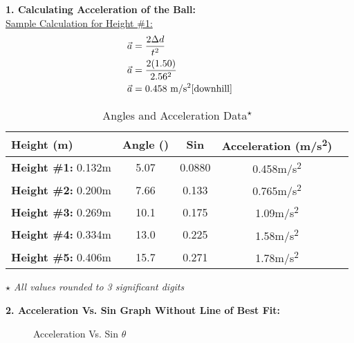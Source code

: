 \documentclass[12pt,letterpaper]{article}
\begin{document}
\textbf{1. Calculating Acceleration of the Ball:} \\
\underline{Sample Calculation for Height \#1:}\\
\[
	\begin{aligned}
		\vec{a} & =\frac{2\Delta d}{t^2}                         \\
		\vec{a} & =\frac{2(1.50)}{2.56^2}                        \\
		\vec{a} & =0.458~\text{m/s\textsuperscript{2}[downhill]}
	\end{aligned}
\]
\begin{table}[H]
	\caption{Angles and Acceleration Data\textsuperscript{$\star$}\label{table2}}
	\begin{tabular*}{\textwidth}{l@{\extracolsep{\fill}}cccc}
		\hline
		\textbf{\hspace{4mm} Height (m)} & \textbf{Angle (\textdegree)} & \textbf{Sin \bm{$\theta$}} & \textbf{Acceleration (m/s\textsuperscript{2})} \\
		\hline
		\textbf{Height \#1:} 0.132m& 5.07\textdegree& 0.0880& 0.458m/s\textsuperscript{2}\\
		\textbf{Height \#2:} 0.200m& 7.66\textdegree& 0.133& 0.765m/s\textsuperscript{2}\\
		\textbf{Height \#3:} 0.269m& 10.1\textdegree& 0.175& 1.09m/s\textsuperscript{2}\\
		\textbf{Height \#4:} 0.334m& 13.0\textdegree& 0.225& 1.58m/s\textsuperscript{2}\\
		\textbf{Height \#5:} 0.406m& 15.7\textdegree& 0.271& 1.78m/s\textsuperscript{2}\\
		\hline
	\end{tabular*}
\end{table}
\vspace{-8mm}
\hspace{-6mm}\textit{$\star$ All values rounded to 3 significant digits}
\newpage

\noindent
\textbf{2. Acceleration Vs. Sin \bm{$\theta$} Graph Without Line of Best Fit:}

\begin{figure}[H]
	\caption{Acceleration Vs. Sin $\theta$\label{figure1}}
	\vspace{-4mm}
\end{figure}
\end{document}
